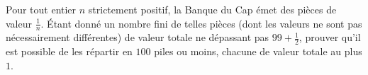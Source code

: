 Pour tout entier $n$ strictement positif, la Banque du Cap émet des pièces de valeur $\frac{1}{n}$. Étant
donné un nombre fini de telles pièces (dont les valeurs ne sont pas nécessairement différentes) de valeur
totale ne dépassant pas $99 + \frac{1}{2}$, prouver qu'il est possible de les répartir en $100$ piles ou
moins, chacune de valeur totale au plus $1$.
